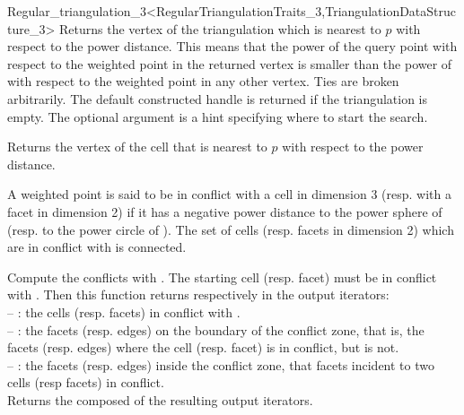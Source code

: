 \begin{ccRefClass}{Regular_triangulation_3<RegularTriangulationTraits_3,TriangulationDataStructure_3>}
{Returns the vertex of the triangulation which is nearest to $p$
with respect to the power distance. This  means that the power
of the  query point  with respect to the weighted point in
the returned vertex is smaller than the power of 
 with respect to the weighted point
in any other vertex. Ties are broken arbitrarily.
The default constructed
handle is returned if the triangulation is empty. 
The optional argument  is a hint
specifying where to start the search.
} 


{Returns the vertex of the cell  
that is nearest to $p$
with respect to the power distance.
}

A  weighted point  is said to be in conflict 
with a cell  in dimension 3
(resp. with a facet  in dimension 2) 
if it has a negative power distance 
to the power sphere  of   
(resp.  to the power circle of ).
The set of cells (resp. facets in dimension 2) which are in conflict with
 is connected.

{ Compute the conflicts with .
 The starting cell
(resp.  facet)  must be in conflict with  .  
Then this function returns
respectively in the output iterators:\\
-- : the cells (resp. facets) in conflict  with  .\\
-- : the facets (resp. edges) on the boundary of the
conflict  zone, that is, the facets
(resp. edges)  where the cell (resp. facet)  is in
conflict, but  is not.\\
-- : the facets (resp. edges) inside the conflict zone, 
that facets incident to two cells (resp facets) in conflict.\\
Returns the  composed of the resulting output iterators.
}


\end{ccRefClass}
